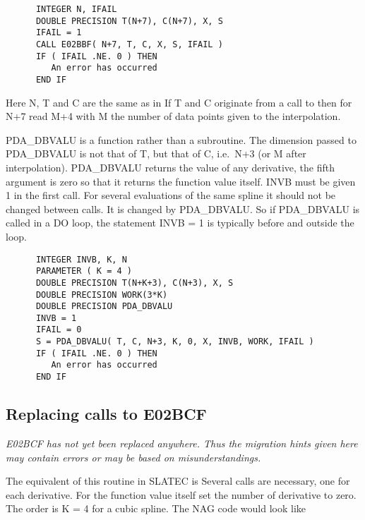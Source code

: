 \begin{verbatim}
      INTEGER N, IFAIL
      DOUBLE PRECISION T(N+7), C(N+7), X, S
      IFAIL = 1
      CALL E02BBF( N+7, T, C, X, S, IFAIL )
      IF ( IFAIL .NE. 0 ) THEN
         An error has occurred
      END IF
\end{verbatim}

   Here N, T and C are the same as in
   If T and C originate from
   a call to
   then for N+7 read M+4 with M the number of data
   points given to the interpolation.

   PDA\_DBVALU is a function rather than a subroutine. The dimension passed
   to PDA\_DBVALU is not that of T, but that of C, i.e.\ N+3 (or M after
   interpolation). PDA\_DBVALU returns the value of any derivative, the fifth
   argument is zero so that it returns the function value itself. INVB
   must be given 1 in the first call. For several evaluations of the
   same spline it should not be changed between calls. It is changed by
   PDA\_DBVALU. So if PDA\_DBVALU is called in a DO loop, the statement INVB = 1
   is typically before and outside the loop.

\begin{verbatim}
      INTEGER INVB, K, N
      PARAMETER ( K = 4 )
      DOUBLE PRECISION T(N+K+3), C(N+3), X, S
      DOUBLE PRECISION WORK(3*K)
      DOUBLE PRECISION PDA_DBVALU
      INVB = 1
      IFAIL = 0
      S = PDA_DBVALU( T, C, N+3, K, 0, X, INVB, WORK, IFAIL )
      IF ( IFAIL .NE. 0 ) THEN
         An error has occurred
      END IF
\end{verbatim}


\subsection{Replacing calls to E02BCF}

{\em E02BCF has not yet been replaced anywhere. Thus the
   migration hints given here may contain errors or may be based on
   misunderstandings.\/}

   The equivalent of this routine in SLATEC is
   Several calls are
   necessary, one for each derivative. For the function value itself set
   the number of derivative to zero. The order is K = 4 for a cubic
   spline. The NAG code would look like

